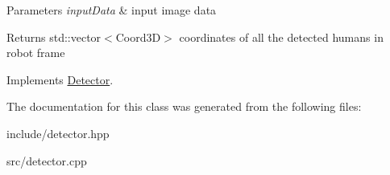 \begin{DoxyParams}{Parameters}
{\em input\+Data} & input image data \\
\hline
\end{DoxyParams}
\begin{DoxyReturn}{Returns}
std\+::vector$<$\+Coord3\+D$>$ coordinates of all the detected humans in robot frame 
\end{DoxyReturn}


Implements \hyperlink{classDetector_a70a59ddd18ef4015a74d158e7d70aba4}{Detector}.



The documentation for this class was generated from the following files\+:\begin{DoxyCompactItemize}
\item 
include/detector.\+hpp\item 
src/detector.\+cpp\end{DoxyCompactItemize}
